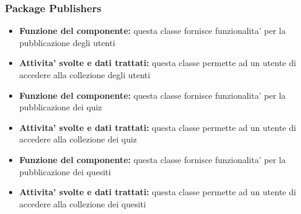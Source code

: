 			\subsubsection{Package Publishers}
			\begin{center}

			\end{center}
			\begin{itemize}
				\item\textbf{Funzione del componente:} questa classe fornisce funzionalita' per la pubblicazione degli utenti
				\item\textbf{Attivita' svolte e dati trattati:} questa classe permette ad un utente di accedere alla collezione degli utenti
			\end{itemize}
			\begin{itemize}
				\item\textbf{Funzione del componente:} questa classe fornisce funzionalita' per la pubblicazione dei quiz
				\item\textbf{Attivita' svolte e dati trattati:} questa classe permette ad un utente di accedere alla collezione dei quiz
			\end{itemize}
			\begin{itemize}
				\item\textbf{Funzione del componente:} questa classe fornisce funzionalita' per la pubblicazione dei quesiti
				\item\textbf{Attivita' svolte e dati trattati:} questa classe permette ad un utente di accedere alla collezione dei quesiti
			\end{itemize}